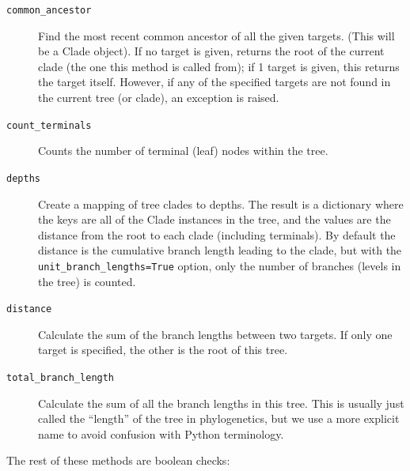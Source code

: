 \documentclass{report}
\begin{document}
\begin{description}
  \item[\texttt{common\_ancestor}]
    Find the most recent common ancestor of all the given targets. (This will be a Clade object). 
    If no target is given, returns the root of the current clade (the one this method is called
    from); if 1 target is given, this returns the target itself.  However, if any of the
    specified targets are not found in the current tree (or clade), an exception is raised.

  \item[\texttt{count\_terminals}]
    Counts the number of terminal (leaf) nodes within the tree.

  \item[\texttt{depths}]
    Create a mapping of tree clades to depths. The result is a dictionary where the keys are
    all of the Clade instances in the tree, and the values are the distance from the root to
    each clade (including terminals). By default the distance is the cumulative branch length
    leading to the clade, but with the \verb|unit_branch_lengths=True| option, only the number
    of branches (levels in the tree) is counted.

  \item[\texttt{distance}]
    Calculate the sum of the branch lengths between two targets.  If only one target is
    specified, the other is the root of this tree.

  \item[\texttt{total\_branch\_length}]
    Calculate the sum of all the branch lengths in this tree. This is usually just called the
    ``length'' of the tree in phylogenetics, but we use a more explicit name to avoid confusion
    with Python terminology.

\end{description}

The rest of these methods are boolean checks:
\end{document}

